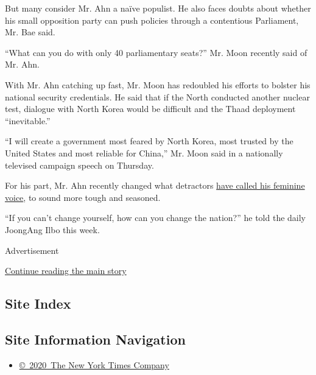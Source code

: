 But many consider Mr. Ahn a naïve populist. He also faces doubts about
whether his small opposition party can push policies through a
contentious Parliament, Mr. Bae said.

``What can you do with only 40 parliamentary seats?'' Mr. Moon recently
said of Mr. Ahn.

With Mr. Ahn catching up fast, Mr. Moon has redoubled his efforts to
bolster his national security credentials. He said that if the North
conducted another nuclear test, dialogue with North Korea would be
difficult and the Thaad deployment ``inevitable.''

``I will create a government most feared by North Korea, most trusted by
the United States and most reliable for China,'' Mr. Moon said in a
nationally televised campaign speech on Thursday.

For his part, Mr. Ahn recently changed what detractors
\href{http://tv.naver.com/v/1551851}{have called his feminine voice}, to
sound more tough and seasoned.

``If you can't change yourself, how can you change the nation?'' he told
the daily JoongAng Ilbo this week.

Advertisement

\protect\hyperlink{after-bottom}{Continue reading the main story}

\hypertarget{site-index}{%
\subsection{Site Index}\label{site-index}}

\hypertarget{site-information-navigation}{%
\subsection{Site Information
Navigation}\label{site-information-navigation}}

\begin{itemize}
\tightlist
\item
  \href{https://help.nytimes3xbfgragh.onion/hc/en-us/articles/115014792127-Copyright-notice}{©~2020~The
  New York Times Company}
\end{itemize}


